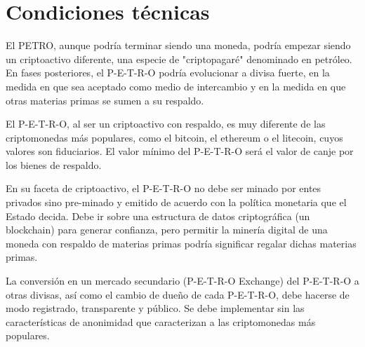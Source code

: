 %
\section{Condiciones técnicas}
\label{sec:annexa}
%
El PETRO, aunque podría terminar siendo una moneda, podría empezar siendo un criptoactivo diferente, una especie de "criptopagaré" denominado en petróleo. En fases posteriores, el P-E-T-R-O podría evolucionar a divisa fuerte, en la medida en que sea aceptado como medio de intercambio y en la medida en que otras materias primas se sumen a su respaldo.

El P-E-T-R-O, al ser un criptoactivo con respaldo, es muy diferente de las criptomonedas más populares, como el bitcoin, el ethereum o el litecoin, cuyos valores son fiduciarios. El valor mínimo del P-E-T-R-O será el valor de canje por los bienes de respaldo. 

En su faceta de criptoactivo, el P-E-T-R-O no debe ser minado por entes privados sino pre-minado y emitido de acuerdo con la política monetaria que el Estado decida. Debe ir sobre una estructura de datos criptográfica (un blockchain) para generar confianza, pero permitir la minería digital de una moneda con respaldo de materias primas podría significar regalar dichas materias primas. 

La conversión en un mercado secundario (P-E-T-R-O Exchange) del P-E-T-R-O a otras divisas, así como el cambio de dueño de cada P-E-T-R-O, debe hacerse de modo registrado, transparente y público. Se debe implementar sin las características de anonimidad que caracterizan a las criptomonedas más populares.

